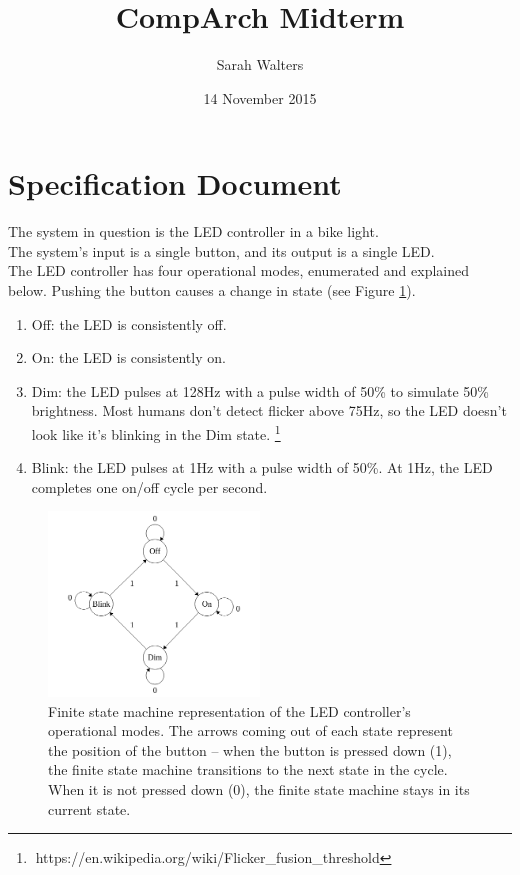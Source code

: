 \documentclass{article}
\title{CompArch Midterm}
\author{Sarah Walters}
\date{14 November 2015}
\begin{document}
\maketitle

\section{Specification Document}
The system in question is the LED controller in a bike light.\\

The system's input is a single button, and its output is a single LED.\\

The LED controller has four operational modes, enumerated and explained below. Pushing the button causes a change in state (see Figure \ref{fig:fsm}).
\begin{enumerate}
\item Off: the LED is consistently off.
\item On: the LED is consistently on.
\item Dim: the LED pulses at 128Hz with a pulse width of 50\% to simulate 50\% brightness. Most humans don't detect flicker above 75Hz, so the LED doesn't look like it's blinking in the Dim state. \footnote{$\;$https://en.wikipedia.org/wiki/Flicker\_fusion\_threshold}
\item Blink: the LED pulses at 1Hz with a pulse width of 50\%. At 1Hz, the LED completes one on/off cycle per second.
\end{enumerate}

\begin{figure}[!ht]
\centering
\includegraphics[width=0.5\textwidth]{img/fsm}
\caption{Finite state machine representation of the LED controller's operational modes. The arrows coming out of each state represent the position of the button -- when the button is pressed down (1), the finite state machine transitions to the next state in the cycle. When it is not pressed down (0), the finite state machine stays in its current state.}
\label{fig:fsm}
\end{figure}
\end{document}
